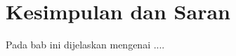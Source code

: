 \chapter{Kesimpulan dan Saran}
\label{chap:kesimpulanDanSaran}

Pada bab ini dijelaskan mengenai ....